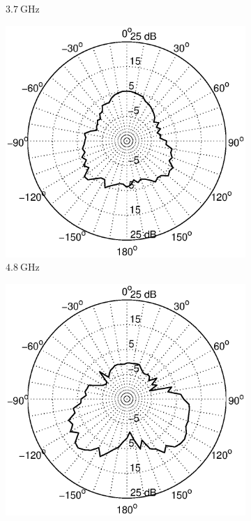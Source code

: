 \documentclass[a4paper]{article}        %
\begin{document}
\begin{figure}[H]
\begin{subfigure}{0.5\textwidth}
			\caption{$\SI{3.7}{\giga\hertz}$}
		\end{subfigure}
		\begin{subfigure}{0.5\textwidth}
			\includegraphics[width=\textwidth]{images/antenna/radpat_azi_4_8G}
			\caption{$\SI{4.8}{\giga\hertz}$}
		\end{subfigure}
		\begin{subfigure}{0.5\textwidth}
			\includegraphics[width=\textwidth]{images/antenna/radpat_azi_5G}

\end{subfigure}
\end{figure}
\end{document}
